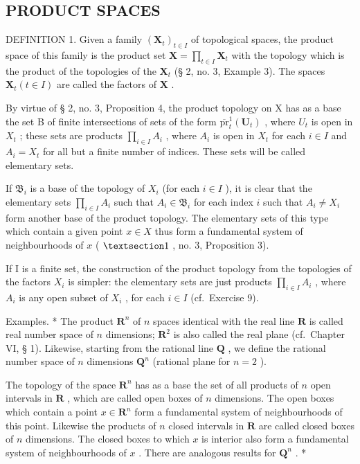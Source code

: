 \subsection{PRODUCT SPACES}

DEFINITION 1. Given a family \((\mathbf{X}_{t})_{t\in I}\) of topological spaces, the product space of this family is the product set \(\mathbf{X} = \prod_{t\in I}\mathbf{X}_{t}\) with the topology which is the product of the topologies of the \(\mathbf{X}_{t}\) (§ 2, no. 3, Example 3). The spaces \(\mathbf{X}_{t}(t\in I)\) are called the factors of \(\mathbf{X}\) .

By virtue of § 2, no. 3, Proposition 4, the product topology on X has as a base the set B of finite intersections of sets of the form \(\overline{\mathrm{pr}}_{t}^{1}(\mathbf{U}_{t})\) , where \(U_{t}\) is open in \(X_{t}\) ; these sets are products \(\prod_{i\in I}A_{i}\) , where \(A_{i}\) is open in \(X_{t}\) for each \(i\in I\) and \(A_{i}=X_{t}\) for all but a finite number of indices. These sets will be called elementary sets.

If \(\mathfrak{B}_i\) is a base of the topology of \(X_i\) (for each \(i \in I\) ), it is clear that the elementary sets \(\prod_{i \in I} A_i\) such that \(A_i \in \mathfrak{B}_i\) for each index \(i\) such that \(A_i \neq X_i\) form another base of the product topology. The elementary sets of this type which contain a given point \(x \in X\) thus form a fundamental system of neighbourhoods of \(x\) ( \(\S 1\) , no. 3, Proposition 3).

If I is a finite set, the construction of the product topology from the topologies of the factors \(X_{i}\) is simpler: the elementary sets are just products \(\prod_{i\in I}A_{i}\) , where \(A_{i}\) is any open subset of \(X_{i}\) , for each \(i\in I\) (cf.~Exercise 9).

Examples. * The product \(\mathbf{R}^n\) of \(n\) spaces identical with the real line \(\mathbf{R}\) is called real number space of \(n\) dimensions; \(\mathbf{R}^2\) is also called the real plane (cf.~Chapter VI, § 1). Likewise, starting from the rational line \(\mathbf{Q}\) , we define the rational number space of \(n\) dimensions \(\mathbf{Q}^n\) (rational plane for \(n = 2\) ).

The topology of the space \(\mathbf{R}^n\) has as a base the set of all products of \(n\) open intervals in \(\mathbf{R}\) , which are called open boxes of \(n\) dimensions. The open boxes which contain a point \(x \in \mathbf{R}^n\) form a fundamental system of neighbourhoods of this point. Likewise the products of \(n\) closed intervals in \(\mathbf{R}\) are called closed boxes of \(n\) dimensions. The closed boxes to which \(x\) is interior also form a fundamental system of neighbourhoods of \(x\) . There are analogous results for \(\mathbf{Q}^n\) . *


